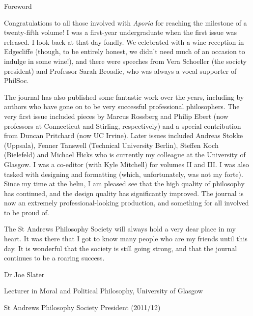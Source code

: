 \vspace*{\credgap}
\begin{center}
    \LARGE \sc Foreword
\end{center}

\vspace{\ackgap}\noindent
Congratulations to all those involved with \emph{Aporia} for reaching
the milestone of a twenty-fifth volume! I was a first-year undergraduate
when the first issue was released. I look back at that day fondly. We
celebrated with a wine reception in Edgecliffe (though, to be entirely
honest, we didn't need much of an occasion to indulge in some wine!),
and there were speeches from Vera Schoeller (the society president) and
Professor Sarah Broadie, who was always a vocal supporter of PhilSoc.

The journal has also published some fantastic work over the years,
including by authors who have gone on to be very successful professional
philosophers. The very first issue included pieces by Marcus Rossberg
and Philip Ebert (now professors at Connecticut and Stirling,
respectively) and a special contribution from Duncan Pritchard (now UC
Irvine). Later issues included Andreas Stokke (Uppsala), Fenner Tanswell
(Technical University Berlin), Steffen Koch (Bielefeld) and Michael
Hicks who is currently my colleague at the University of Glasgow. I was
a co-editor (with Kyle Mitchell) for volumes II and III. I was also
tasked with designing and formatting (which, unfortunately, was not my
forte). Since my time at the helm, I am pleased see that the high
quality of philosophy has continued, and the design quality has
significantly improved. The journal is now an extremely
professional-looking production, and something for all involved to be
proud of.

The St Andrews Philosophy Society will always hold a very dear place in
my heart. It was there that I got to know many people who are my friends
until this day. It is wonderful that the society is still going strong,
and that the journal continues to be a roaring success.

\vspace{\ackgap}\noindent
Dr Joe Slater

\noindent
Lecturer in Moral and Political Philosophy, University of Glasgow

\noindent
St Andrews Philosophy Society President (2011/12)
